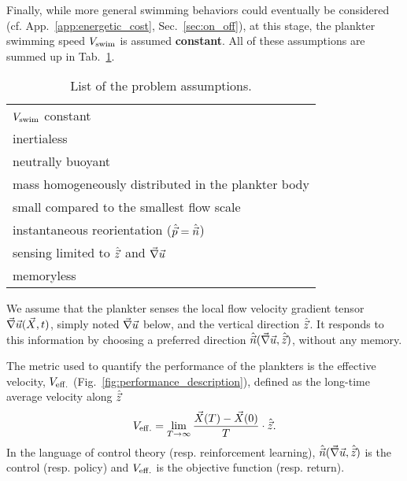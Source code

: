 Finally, while more general swimming behaviors could eventually be considered (cf. App.~\ref{app:energetic_cost}, Sec.~\ref{sec:on_off}), at this stage, the plankter swimming speed $V_{\mathrm{swim}}$ is assumed \textbf{constant}.
All of these assumptions are summed up in Tab.~\ref{tab:problem_assumptions}.
\begin{table}
	\center
	\begin{tabular*}{\textwidth}{ l }
		\toprule
		{} $V_{\mathrm{swim}}$ constant \\
		{} inertialess \\
		{} neutrally buoyant \\
		{} mass homogeneously distributed in the plankter body \\
		{} small compared to the smallest flow scale \\
		{} instantaneous reorientation ($\hat{\vec{p}} = \hat{\vec{n}}$) \\
		{} sensing limited to $\hat{\vec{z}}$ and $\vec{\nabla} \vec{u}$ \\
		{} memoryless \\
		\bottomrule
	\end{tabular*}
	\caption{
		List of the problem assumptions.
	}
	\label{tab:problem_assumptions}
\end{table}
We assume that the plankter senses the local flow velocity gradient tensor $\vec{\nabla} \vec{u} (\vec{X}, t)$, simply noted $\vec{\nabla} \vec{u}$ below, and the vertical direction $\hat{\vec{z}}$.
It responds to this information by choosing a preferred direction $\hat{\vec{n}}(\vec{\nabla} \vec{u},\hat{\vec{z}})$, without any memory.

The metric used to quantify the performance of the plankters is the effective velocity, $V_{\mathrm{eff.}}$ (Fig.~\ref{fig:performance_description}), defined as the long-time average velocity along $\hat{\vec{z}}$
\begin{equation}
	\label{eq:surfing_performance}
	V_{\mathrm{eff.}} = \lim_{T\to\infty} \frac{\vec{X} (T) - \vec{X} (0)}{T} \cdot \hat{\vec{z}}.
\end{equation}
In the language of control theory (resp. reinforcement learning), $\hat{\vec{n}}(\vec{\nabla} \vec{u},\hat{\vec{z}})$ is the control (resp. policy) and $V_{\mathrm{eff.}}$ is the objective function (resp. return).

